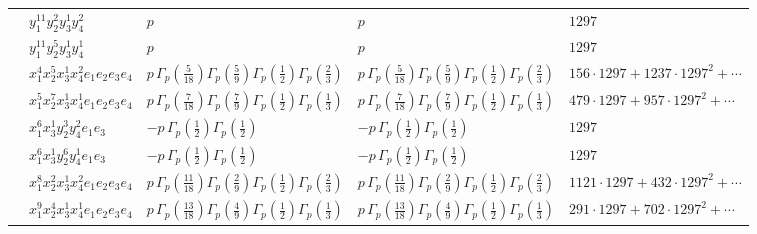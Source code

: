 \documentclass[11pt]{article}
\begin{document}
\begin{table}[ht]
{\begin{tabular}{@{}lllll@{}}
 & $y_{1}^{11} y_{2}^{2} y_{3}^{1} y_{4}^{2}$ & $p \,$ & $p \,$ & $1297$ \\
 & $y_{1}^{11} y_{2}^{5} y_{3}^{1} y_{4}^{1}$ & $p \,$ & $p \,$ & $1297$ \\
 & $x_{1}^{4} x_{2}^{5} x_{3}^{1} x_{4}^{2}  e_{1} e_{2} e_{3} e_{4}$ & $p \, \Gamma_p \left( \frac{5}{18} \right) \Gamma_p \left( \frac{5}{9} \right) \Gamma_p \left( \frac{1}{2} \right) \Gamma_p \left( \frac{2}{3} \right)$ & $p \, \Gamma_p \left( \frac{5}{18} \right) \Gamma_p \left( \frac{5}{9} \right) \Gamma_p \left( \frac{1}{2} \right) \Gamma_p \left( \frac{2}{3} \right)$ & $156{\cdot}1297{+}1237{\cdot}1297^{2}{+}\cdots$ \\
 & $x_{1}^{5} x_{2}^{7} x_{3}^{1} x_{4}^{1}  e_{1} e_{2} e_{3} e_{4}$ & $p \, \Gamma_p \left( \frac{7}{18} \right) \Gamma_p \left( \frac{7}{9} \right) \Gamma_p \left( \frac{1}{2} \right) \Gamma_p \left( \frac{1}{3} \right)$ & $p \, \Gamma_p \left( \frac{7}{18} \right) \Gamma_p \left( \frac{7}{9} \right) \Gamma_p \left( \frac{1}{2} \right) \Gamma_p \left( \frac{1}{3} \right)$ & $479{\cdot}1297{+}957{\cdot}1297^{2}{+}\cdots$ \\
 & $x_{1}^{6} x_{3}^{1} y_{2}^{3} y_{4}^{2} e_{1} e_{3}$ & $- p \, \Gamma_p \left( \frac{1}{2} \right) \Gamma_p \left( \frac{1}{2} \right)$ & $- p \, \Gamma_p \left( \frac{1}{2} \right) \Gamma_p \left( \frac{1}{2} \right)$ & $1297$ \\
 & $x_{1}^{6} x_{3}^{1} y_{2}^{6} y_{4}^{1} e_{1} e_{3}$ & $- p \, \Gamma_p \left( \frac{1}{2} \right) \Gamma_p \left( \frac{1}{2} \right)$ & $- p \, \Gamma_p \left( \frac{1}{2} \right) \Gamma_p \left( \frac{1}{2} \right)$ & $1297$ \\
 & $x_{1}^{8} x_{2}^{2} x_{3}^{1} x_{4}^{2}  e_{1} e_{2} e_{3} e_{4}$ & $p \, \Gamma_p \left( \frac{11}{18} \right) \Gamma_p \left( \frac{2}{9} \right) \Gamma_p \left( \frac{1}{2} \right) \Gamma_p \left( \frac{2}{3} \right)$ & $p \, \Gamma_p \left( \frac{11}{18} \right) \Gamma_p \left( \frac{2}{9} \right) \Gamma_p \left( \frac{1}{2} \right) \Gamma_p \left( \frac{2}{3} \right)$ & $1121{\cdot}1297{+}432{\cdot}1297^{2}{+}\cdots$ \\
 & $x_{1}^{9} x_{2}^{4} x_{3}^{1} x_{4}^{1}  e_{1} e_{2} e_{3} e_{4}$ & $p \, \Gamma_p \left( \frac{13}{18} \right) \Gamma_p \left( \frac{4}{9} \right) \Gamma_p \left( \frac{1}{2} \right) \Gamma_p \left( \frac{1}{3} \right)$ & $p \, \Gamma_p \left( \frac{13}{18} \right) \Gamma_p \left( \frac{4}{9} \right) \Gamma_p \left( \frac{1}{2} \right) \Gamma_p \left( \frac{1}{3} \right)$ & $291{\cdot}1297{+}702{\cdot}1297^{2}{+}\cdots$ \\

\end{tabular}}
\end{table}
\end{document}
